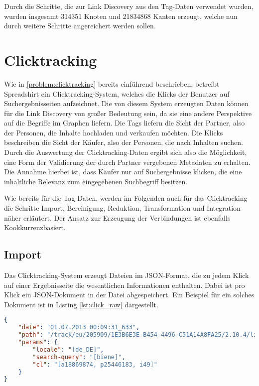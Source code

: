 Durch die Schritte, die zur Link Discovery aus den Tag-Daten verwendet wurden, wurden insgesamt \num{314351} Knoten und \num{21834868} Kanten erzeugt, welche nun durch weitere Schritte angereichert werden sollen.

\section{Clicktracking}

Wie in \ref{problem:clicktracking} bereits einführend beschrieben, betreibt Spreadshirt ein Clicktracking-System, welches die Klicks der Benutzer auf Suchergebnisseiten aufzeichnet. Die von diesem System erzeugten Daten können für die Link Discovery von großer Bedeutung sein, da sie eine andere Perspektive auf die Begriffe im Graphen liefern. Die Tags liefern die Sicht der Partner, also der Personen, die Inhalte hochladen und verkaufen möchten. Die Klicks beschreiben die Sicht der Käufer, also der Personen, die nach Inhalten suchen. Durch die Auswertung der Clicktracking-Daten ergibt sich also die Möglichkeit, eine Form der Validierung der durch Partner vergebenen Metadaten zu erhalten. Die Annahme hierbei ist, dass Käufer nur auf Suchergebnisse klicken, die eine inhaltliche Relevanz zum eingegebenen Suchbegriff besitzen.

Wie bereits für die Tag-Daten, werden im Folgenden auch für das Clicktracking die Schritte Import, Bereinigung, Reduktion, Transformation und Integration näher erläutert. Der Ansatz zur Erzeugung der Verbindungen ist ebenfalls Kookkurrenzbasiert.

\subsection{Import}
\label{click_import}

Das Clicktracking-System erzeugt Dateien im JSON-Format, die zu jedem Klick auf einer Ergebnisseite die wesentlichen Informationen enthalten. Dabei ist pro Klick ein JSON-Dokument in der Datei abgespeichert. Ein Beispiel für ein solches Dokument ist in Listing \ref{lst:click_raw} dargestellt.

\begin{lstlisting}[language=json, label={lst:click_raw}, caption={Clicktracking - Rohdokument als JSON}]
{
    "date": "01.07.2013 00:09:31_633",
    "path": "/track/eu/205909/1E3B6E3E-B454-4496-C51A14A8FA25/2.10.4/list",
    "params": {
        "locale": "[de_DE]",
        "search-query": "[biene]",
        "cl": "[a18869874, p25446183, i49]"
    }
}
\end{lstlisting}

